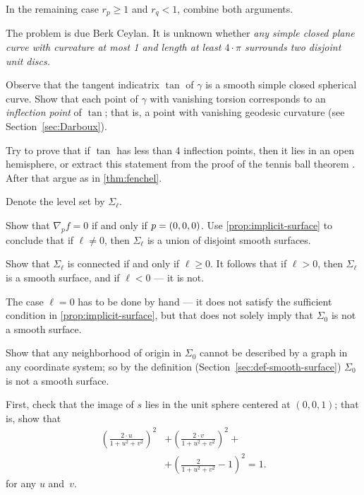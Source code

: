 \begin{multicols}{2}
In the remaining case $r_p\ge 1$ and $r_q<1$, combine both arguments.

 The problem is due Berk Ceylan.
It is unknown whether \textit{any simple closed plane curve with curvature at most 1 and length at least $4\cdot\pi$ surrounds two disjoint unit discs.}

Observe that the tangent indicatrix $\tan$ of $\gamma$ is a smooth simple closed spherical curve.
Show that each point of $\gamma$ with vanishing torsion corresponds to an {}\emph{inflection point} of $\tan$;
that is, a point with vanishing geodesic curvature (see Section~\ref{sec:Darboux}).

Try to prove that if $\tan$ has less than 4 inflection points, then it lies in an open hemisphere,
or extract this statement from the proof of the tennis ball theorem \cite[§ 20]{arnold1994}.
After that argue as in \ref{thm:fenchel}.



\setcounter{eqtn}{0}

Denote the level set by $\Sigma_\ell$.

Show that $\nabla_p f=0$ if and only if $p\z=(0,0,0)$.
Use \ref{prop:implicit-surface} to conclude that if $\ell\ne 0$, then $\Sigma_\ell$ is a union of disjoint smooth surfaces.

Show that $\Sigma_\ell$ is connected if and only if $\ell\ge 0$.
It follows that if $\ell>0$, then $\Sigma_\ell$ is a smooth surface, and if $\ell<0$ --- it is not.

The case $\ell=0$ has to be done by hand --- it does not satisfy the sufficient condition in \ref{prop:implicit-surface}, but that does not solely imply that $\Sigma_0$ is not a smooth surface.

Show that any neighborhood of origin in $\Sigma_0$ cannot be described by a graph in any coordinate system;
so by the definition (Section~\ref{sec:def-smooth-surface}) $\Sigma_0$ is not a smooth surface.

First, check that the image of $s$ lies in the unit sphere centered at $(0,0,1)$;
that is, show that 
\begin{align*}
\left(\tfrac{2\cdot u}{1+u^2+v^2}\right)^2
&+
\left(\tfrac{2\cdot v}{1+u^2+v^2}\right)^2+
\\
&+\left(\tfrac{2}{1+u^2+v^2}-1\right)^2=1.
\end{align*}
for any $u$ and~$v$.


\end{multicols}
